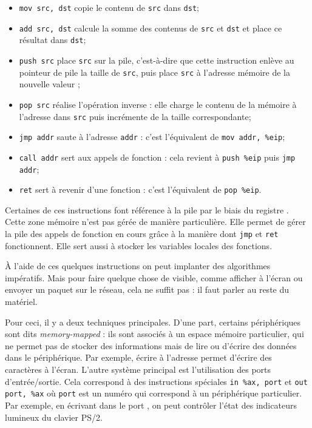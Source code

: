 \begin{itemize}

\item \texttt{mov src, dst} copie le contenu de \texttt{src} dans \texttt{dst};

\item \texttt{add src, dst} calcule la somme des contenus de \texttt{src} et
  \texttt{dst} et place ce résultat dans \texttt{dst};

\item \texttt{push src} place \texttt{src} sur la pile, c'est-à-dire que cette
  instruction enlève au pointeur de pile \esp la taille de \texttt{src}, puis
  place \texttt{src} à l'adresse mémoire de la nouvelle valeur \esp;

\item \texttt{pop src} réalise l'opération inverse : elle charge le contenu de
  la mémoire à l'adresse \esp dans \texttt{src} puis incrémente \esp de la
  taille correspondante;

\item \texttt{jmp addr} saute à l'adresse \texttt{addr} : c'est l'équivalent de
  \texttt{mov addr, \%eip};

\item \texttt{call addr} sert aux appels de fonction : cela revient à
  \texttt{push \%eip} puis \texttt{jmp addr};

\item \texttt{ret} sert à revenir d'une fonction : c'est l'équivalent de
  \texttt{pop \%eip}.

\end{itemize}

Certaines de ces instructions font référence à la pile par le biais du registre
\esp. Cette zone mémoire n'est pas gérée de manière particulière. Elle permet de
gérer la pile des appels de fonction en cours grâce à la manière dont
\texttt{jmp} et \texttt{ret} fonctionnent. Elle sert aussi à stocker les
variables locales des fonctions.

À l'aide de ces quelques instructions on peut implanter des algorithmes
impératifs. Mais pour faire quelque chose de visible, comme afficher à l'écran
ou envoyer un paquet sur le réseau, cela ne suffit pas : il faut parler au reste
du matériel.

Pour ceci, il y a deux techniques principales. D'une part, certains
périphériques sont dits \emph{memory-mapped} : ils sont associés à un espace
mémoire particulier, qui ne permet pas de stocker des informations mais de lire
ou d'écrire des données dans le périphérique. Par exemple, écrire à l'adresse
 permet d'écrire des caractères à l'écran. L'autre système principal
est l'utilisation des ports d'entrée/sortie. Cela correspond à des instructions
spéciales \texttt{in \%ax, port} et \texttt{out port, \%ax} où \texttt{port}
est un numéro qui correspond à un périphérique particulier. Par exemple, en
écrivant dans le port , on peut contrôler l'état des indicateurs
lumineux du clavier PS/2.

